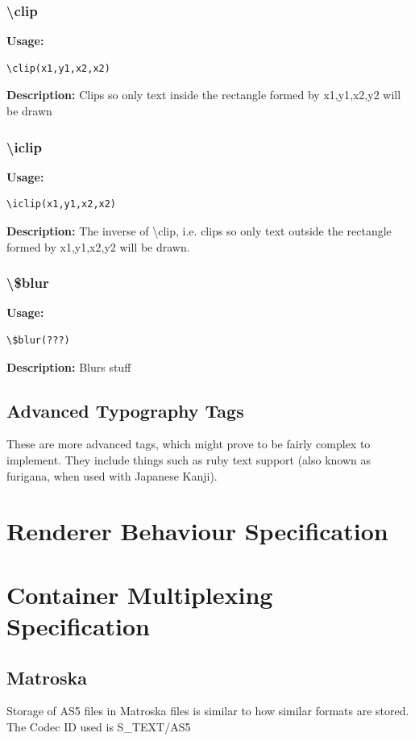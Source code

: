 \documentclass{spec}
\begin{document}
\subsubsection{\textbackslash clip}
\textbf{Usage:}
\begin{verbatim}
\clip(x1,y1,x2,x2)
\end{verbatim}

\textbf{Description:}
Clips so only text inside the rectangle formed by x1,y1,x2,y2 will be drawn

\subsubsection{\textbackslash iclip}
\textbf{Usage:}
\begin{verbatim}
\iclip(x1,y1,x2,x2)
\end{verbatim}

\textbf{Description:}
The inverse of \textbackslash clip, i.e. clips so only text outside the rectangle formed
by x1,y1,x2,y2 will be drawn.

\subsubsection{\textbackslash \$blur}
\textbf{Usage:}
\begin{verbatim}
\$blur(???)
\end{verbatim}

\textbf{Description:}
Blurs stuff

\subsection{Advanced Typography Tags}
These are more advanced tags, which might prove to be fairly complex to implement. They include
things such as ruby text support (also known as furigana, when used with Japanese Kanji).



\newpage
\section{Renderer Behaviour Specification}


\newpage
\section{Container Multiplexing Specification}

\subsection{Matroska}
Storage of AS5 files in Matroska files is similar to how similar formats are stored.\cite{mkv ssa}
The Codec ID used is \textsc{S\_TEXT/AS5}
\end{document}

